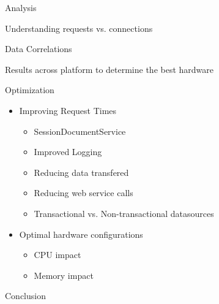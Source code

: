 \documentclass[xcolor=dvipsnames,14pt]{beamer}
\begin{document}
\begin{frame}{Analysis}
  \item Understanding requests vs. connections
  \item Data Correlations
  \item Results across platform to determine the best hardware
\end{frame}

\begin{frame}{Optimization}
  \begin{itemize}
    \item Improving Request Times
      \begin{itemize}
        \item SessionDocumentService
        \item Improved Logging
        \item Reducing data transfered
        \item Reducing web service calls
        \item Transactional vs. Non-transactional datasources
      \end{itemize}
    \item Optimal hardware configurations
      \begin{itemize}
        \item CPU impact
        \item Memory impact
      \end{itemize}
  \end{itemize}
\end{frame}

\begin{frame}{Conclusion}
\end{frame}
\end{document}
